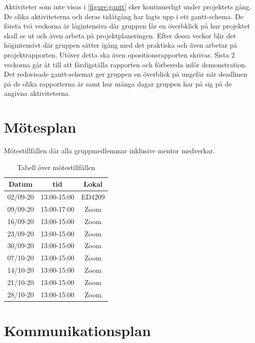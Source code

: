 \documentclass[a4paper]{article}
\begin{document}
Aktiviteter som inte visas i \ref{figure:gantt} sker kontinuerligt under projektets gång. De olika aktiviteterna och deras tidåtgång har lagts upp i ett gantt-schema. De första två veckorna är lågintensiva där gruppen får en överbklick på hur projektet skall se ut och även arbeta på projektplaneringen. Efter dessa veckor blir det högintensivt där gruppen sätter igång med det praktiska och även arbetar på projektrapporten. Utöver detta ska även opositionsrapporten skrivas. Sista 2 veckorna går åt till att färdigställa rapporten och förbereda inför demonstration. Det redovisade gantt-schemat ger gruppen en överblick på ungefär när deadlinen på de olika rapporterna är samt hur många dagar gruppen har på sig på de angivna aktiviteterna.

\section{Mötesplan}

Mötestillfällen där alla gruppmedlemmar inklusive mentor medverkar.

\begin{table}[H]
    \begin{center}
        \begin{tabular}{ |c|c|c| }\hline
            Datum & tid & Lokal \\\hline\hline
            02/09-20 & 13:00-15:00 & ED4209 \\\hline
            09/09-20 & 15:00-17:00 & Zoom \\\hline
            16/09-20 & 13:00-15:00 & Zoom \\\hline
            23/09-20 & 13:00-15:00 & Zoom \\\hline
            30/09-20 & 13:00-15:00 & Zoom \\\hline
            07/10-20 & 13:00-15:00 & Zoom \\\hline
            14/10-20 & 13:00-15:00 & Zoom \\\hline
            21/10-20 & 13:00-15:00 & Zoom \\\hline
            28/10-20 & 13:00-15:00 & Zoom \\\hline
        \end{tabular}
        \caption{Tabell över mötestillfällen}
        \label{table:motesplan}
    \end{center}
\end{table}

\section{Kommunikationsplan}
\end{document}
